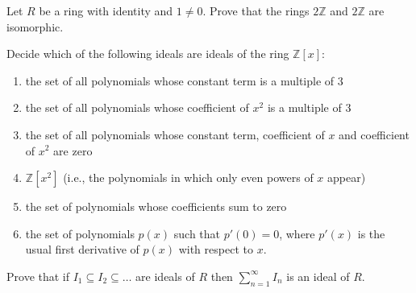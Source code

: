 \documentclass[12pt,letterpaper]{hmcpset}
\newcommand{\Zz}{\mathbb{Z}}
\begin{document}

\begin{problem}[7.3.1]
	Let $R$ be a ring with identity and $1 \ne 0$. Prove that the rings $2\Zz$ and $2\Zz$ are isomorphic.
\end{problem}

\begin{solution}
\vfill
\end{solution}
\newpage

\begin{problem}[7.3.10]
	Decide which of the following ideals are ideals of the ring $\Zz[x]$:
	\begin{enumerate}
	    \item
	        the set of all polynomials
	        whose constant term is a
	        multiple of $3$
	    \item
	        the set of all polynomials
	        whose coefficient of
	        $x^2$ is a multiple of $3$
	    \item
	        the set of all polynomials
	        whose constant term, coefficient
	        of $x$ and coefficient of $x^2$
	        are zero
	    \item
	        $\Zz[x^2]$ (i.e., the polynomials
	        in which only even powers of $x$
	        appear)
	    \item
	        the set of polynomials whose
	        coefficients sum to zero
	    \item
	        the set of polynomials $p(x)$
	        such that $p'(0) = 0$, where
	        $p'(x)$ is the usual
	        first derivative of $p(x)$
	        with respect to $x$.
	\end{enumerate}
\end{problem}

\begin{solution}
\vfill
\end{solution}
\newpage

\begin{problem}[7.3.19]
	Prove that if $I_1 \subseteq I_2 \subseteq \dots $ are ideals of $R$ then $\sum_{n=1}^\infty I_n$ is an ideal of $R$.
\end{problem}

\begin{solution}
\vfill
\end{solution}
\newpage
\end{document}
